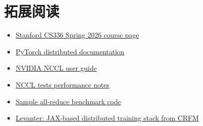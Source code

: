 \section{拓展阅读}

\begin{itemize}
    \item \href{https://cs336.stanford.edu/}{Stanford CS336 Spring 2026 course page}
    \item \href{https://pytorch.org/docs/stable/distributed.html}{PyTorch distributed documentation}
    \item \href{https://docs.nvidia.com/deeplearning/nccl/user-guide/docs/}{NVIDIA NCCL user guide}
    \item \href{https://github.com/NVIDIA/nccl-tests/blob/master/doc/PERFORMANCE.md#allreduce}{NCCL tests performance notes}
    \item \href{https://github.com/stas00/ml-engineering/blob/master/network/benchmarks/all_reduce_bench.py}{Sample all-reduce benchmark code}
    \item \href{https://crfm.stanford.edu/2023/06/16/levanter-1_0-release.html}{Levanter: JAX-based distributed training stack from CRFM}
\end{itemize}

